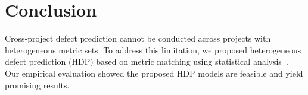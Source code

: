 \section{Conclusion}
\label{sec:Conclusion}

Cross-project defect prediction cannot be conducted across projects
with heterogeneous metric sets. To address
this limitation, we proposed heterogeneous defect prediction (HDP) based on
metric matching using statistical analysis~\cite{Massey51}. Our empirical evaluation
showed the proposed HDP models are feasible and yield promising results.






